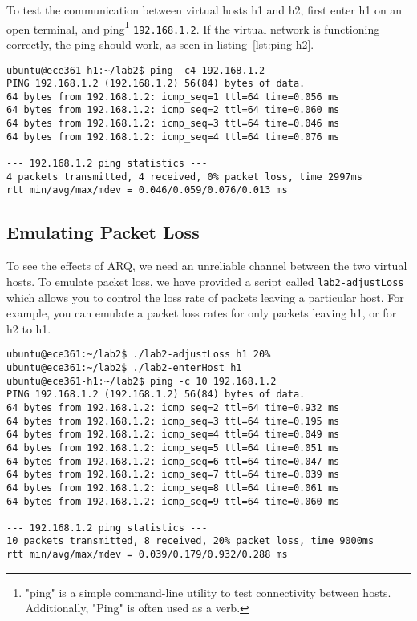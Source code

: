 \documentclass[11pt]{article}
\begin{document}
To test the communication between virtual hosts h1 and h2, first enter h1 on an open terminal, and ping\footnote{"ping" is a simple command-line utility to test connectivity between hosts. Additionally, "Ping" is often used as a verb.} \texttt{192.168.1.2}.
If the virtual network is functioning correctly, the ping should work, as seen in listing~\ref{lst:ping-h2}.

\begin{lstlisting}[style=ece361shell, caption={Pinging h2 from within h1.}, label={lst:ping-h2}]
ubuntu@ece361-h1:~/lab2$ ping -c4 192.168.1.2
PING 192.168.1.2 (192.168.1.2) 56(84) bytes of data.
64 bytes from 192.168.1.2: icmp_seq=1 ttl=64 time=0.056 ms
64 bytes from 192.168.1.2: icmp_seq=2 ttl=64 time=0.060 ms
64 bytes from 192.168.1.2: icmp_seq=3 ttl=64 time=0.046 ms
64 bytes from 192.168.1.2: icmp_seq=4 ttl=64 time=0.076 ms

--- 192.168.1.2 ping statistics ---
4 packets transmitted, 4 received, 0% packet loss, time 2997ms
rtt min/avg/max/mdev = 0.046/0.059/0.076/0.013 ms
\end{lstlisting}


\subsection{Emulating Packet Loss}
To see the effects of ARQ, we need an unreliable channel between the two virtual hosts.
To emulate packet loss, we have provided a script called \texttt{lab2-adjustLoss} which allows you to control the loss rate of packets leaving a particular host.
For example, you can emulate a packet loss rates for only packets leaving h1, or for h2 to h1.


\begin{lstlisting}[style=ece361shell, caption={Emulating packet loss.}, label={lst:adjust-loss}]
ubuntu@ece361:~/lab2$ ./lab2-adjustLoss h1 20%
ubuntu@ece361:~/lab2$ ./lab2-enterHost h1
ubuntu@ece361-h1:~/lab2$ ping -c 10 192.168.1.2
PING 192.168.1.2 (192.168.1.2) 56(84) bytes of data.
64 bytes from 192.168.1.2: icmp_seq=2 ttl=64 time=0.932 ms
64 bytes from 192.168.1.2: icmp_seq=3 ttl=64 time=0.195 ms
64 bytes from 192.168.1.2: icmp_seq=4 ttl=64 time=0.049 ms
64 bytes from 192.168.1.2: icmp_seq=5 ttl=64 time=0.051 ms
64 bytes from 192.168.1.2: icmp_seq=6 ttl=64 time=0.047 ms
64 bytes from 192.168.1.2: icmp_seq=7 ttl=64 time=0.039 ms
64 bytes from 192.168.1.2: icmp_seq=8 ttl=64 time=0.061 ms
64 bytes from 192.168.1.2: icmp_seq=9 ttl=64 time=0.060 ms

--- 192.168.1.2 ping statistics ---
10 packets transmitted, 8 received, 20% packet loss, time 9000ms
rtt min/avg/max/mdev = 0.039/0.179/0.932/0.288 ms
\end{lstlisting}
\end{document}
